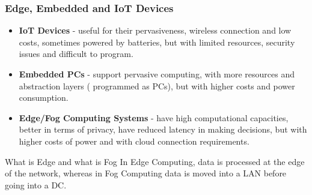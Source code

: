 \subsubsection{Edge, Embedded and IoT Devices}
\begin{itemize}
    \item \textbf{IoT Devices} -
    useful for their pervasiveness, wireless connection and low costs, sometimes
    powered by batteries, but with limited resources, security issues and 
    difficult to program.
    \item \textbf{Embedded PCs} -
    support pervasive computing, with more resources and abstraction layers (
    programmed as PCs), but with higher costs and power consumption.
    \item \textbf{Edge/Fog Computing Systems} -
    have high computational capacities, better in terms of privacy, have 
    reduced latency in making decisions, but with higher costs of power
    and with cloud connection requirements.
\end{itemize}
\begin{warning}{What is Edge and what is Fog}
    In Edge Computing, data is processed at the edge of the network, whereas
    in Fog Computing data is moved into a LAN before going into a DC.
\end{warning}